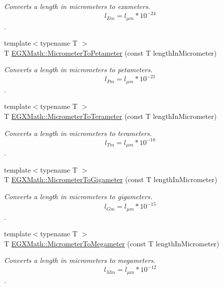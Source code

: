 \begin{DoxyCompactItemize}
\begin{DoxyCompactList}\small\item\em Converts a length in micrometers to exameters. \[ l_{Em}=l_{\mu m} * 10^{-24} \]. \end{DoxyCompactList}\item 
{\footnotesize template$<$typename T $>$ }\\T \mbox{\hyperlink{group___e_g_x_math-_conversions-_length_conversions-_micrometer-_s_i_gaf151d8277712dbb886992fdd357d1c9d}{E\+G\+X\+Math\+::\+Micrometer\+To\+Petameter}} (const T length\+In\+Micrometer)
\begin{DoxyCompactList}\small\item\em Converts a length in micrometers to petameters. \[ l_{Pm}=l_{\mu m} * 10^{-21} \]. \end{DoxyCompactList}\item 
{\footnotesize template$<$typename T $>$ }\\T \mbox{\hyperlink{group___e_g_x_math-_conversions-_length_conversions-_micrometer-_s_i_ga1f22962ca08a1b8970abc277530d07a3}{E\+G\+X\+Math\+::\+Micrometer\+To\+Terameter}} (const T length\+In\+Micrometer)
\begin{DoxyCompactList}\small\item\em Converts a length in micrometers to terameters. \[ l_{Tm}=l_{\mu m} * 10^{-18} \]. \end{DoxyCompactList}\item 
{\footnotesize template$<$typename T $>$ }\\T \mbox{\hyperlink{group___e_g_x_math-_conversions-_length_conversions-_micrometer-_s_i_ga1c29c4f00b8375c21196ac347b030929}{E\+G\+X\+Math\+::\+Micrometer\+To\+Gigameter}} (const T length\+In\+Micrometer)
\begin{DoxyCompactList}\small\item\em Converts a length in micrometers to gigameters. \[ l_{Gm}=l_{\mu m} * 10^{-15} \]. \end{DoxyCompactList}\item 
{\footnotesize template$<$typename T $>$ }\\T \mbox{\hyperlink{group___e_g_x_math-_conversions-_length_conversions-_micrometer-_s_i_ga95c97884708f4bdf027349dc7535c097}{E\+G\+X\+Math\+::\+Micrometer\+To\+Megameter}} (const T length\+In\+Micrometer)
\begin{DoxyCompactList}\small\item\em Converts a length in micrometers to megameters. \[ l_{Mm}=l_{\mu m} * 10^{-12} \]. \end{DoxyCompactList}\item 

\end{DoxyCompactItemize}
